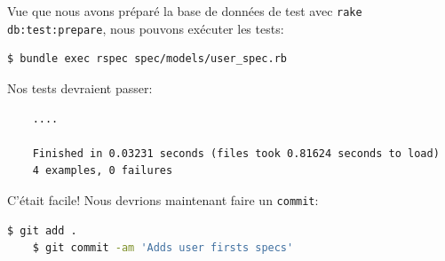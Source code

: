 \documentclass[]{report}
\begin{document}
    Vue que nous avons préparé la base de données de test avec \verb|rake db:test:prepare|, nous pouvons exécuter les tests:


    \begin{scriptsize}
    \begin{lstlisting}[language=bash]
    $ bundle exec rspec spec/models/user_spec.rb
    \end{lstlisting}
    \end{scriptsize}

    Nos tests devraient passer:

    \begin{scriptsize}
    \begin{lstlisting}
    ....

    Finished in 0.03231 seconds (files took 0.81624 seconds to load)
    4 examples, 0 failures
    \end{lstlisting}
    \end{scriptsize}

    C'était facile! Nous devrions maintenant faire un \verb|commit|:

    \begin{scriptsize}
    \begin{lstlisting}[language=bash]
    $ git add .
    $ git commit -am 'Adds user firsts specs'
    \end{lstlisting}
    \end{scriptsize}
\end{document}
